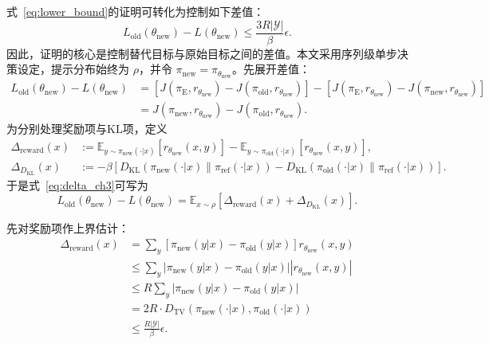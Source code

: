式~\eqref{eq:lower_bound}的证明可转化为控制如下差值：
\begin{equation}
    L_{\mathrm{old}}(\theta_{\mathrm{new}})-L(\theta_{\mathrm{new}})
    \le \frac{3R|\mathcal{Y}|}{\beta}\epsilon.
\end{equation}
因此，证明的核心是控制替代目标与原始目标之间的差值。本文采用序列级单步决策设定，提示分布始终为 $\rho$，并令 $\pi_{\mathrm{new}}=\pi_{\theta_{\mathrm{new}}}$。先展开差值：
\begin{equation}
\label{eq:delta_ch3}
\begin{aligned}
    L_{\mathrm{old}}(\theta_{\mathrm{new}})-L(\theta_{\mathrm{new}})
    &=\left[J(\pi_{\mathrm{E}},r_{\theta_{\mathrm{new}}})-J(\pi_{\mathrm{old}},r_{\theta_{\mathrm{new}}})\right]
    -\left[J(\pi_{\mathrm{E}},r_{\theta_{\mathrm{new}}})-J(\pi_{\mathrm{new}},r_{\theta_{\mathrm{new}}})\right]\\
    &=J(\pi_{\mathrm{new}},r_{\theta_{\mathrm{new}}})-J(\pi_{\mathrm{old}},r_{\theta_{\mathrm{new}}}).
\end{aligned}
\end{equation}
为分别处理奖励项与KL项，定义
\begin{equation}
\begin{aligned}
    \Delta_{\mathrm{reward}}(x)
    &:=
    \mathbb{E}_{y\sim\pi_{\mathrm{new}}(\cdot|x)}
    \left[r_{\theta_{\mathrm{new}}}(x,y)\right]
    -
    \mathbb{E}_{y\sim\pi_{\mathrm{old}}(\cdot|x)}
    \left[r_{\theta_{\mathrm{new}}}(x,y)\right],\\
    \Delta_{D_{\mathrm{KL}}}(x)
    &:=
    -\beta\left[
    D_{\mathrm{KL}}\!\left(\pi_{\mathrm{new}}(\cdot|x)\|\pi_{\mathrm{ref}}(\cdot|x)\right)
    -
    D_{\mathrm{KL}}\!\left(\pi_{\mathrm{old}}(\cdot|x)\|\pi_{\mathrm{ref}}(\cdot|x)\right)
    \right].
\end{aligned}
\end{equation}
于是式~\eqref{eq:delta_ch3}可写为
\begin{equation}
    L_{\mathrm{old}}(\theta_{\mathrm{new}})-L(\theta_{\mathrm{new}})
    =
    \mathbb{E}_{x\sim\rho}\left[\Delta_{\mathrm{reward}}(x)+\Delta_{D_{\mathrm{KL}}}(x)\right].
\end{equation}

先对奖励项作上界估计：
\begin{equation}
\begin{aligned}
    \Delta_{\mathrm{reward}}(x)
    &=\sum_y\left[\pi_{\mathrm{new}}(y|x)-\pi_{\mathrm{old}}(y|x)\right]r_{\theta_{\mathrm{new}}}(x,y)\\
    &\le \sum_y\left|\pi_{\mathrm{new}}(y|x)-\pi_{\mathrm{old}}(y|x)\right|\left|r_{\theta_{\mathrm{new}}}(x,y)\right|\\
    &\le R\sum_y\left|\pi_{\mathrm{new}}(y|x)-\pi_{\mathrm{old}}(y|x)\right|\\
    &=2R\cdot D_{\mathrm{TV}}\left(\pi_{\mathrm{new}}(\cdot|x),\pi_{\mathrm{old}}(\cdot|x)\right)\\
    &\le \frac{R|\mathcal{Y}|}{\beta}\epsilon.
\end{aligned}
\label{eq:reward_delta_bound}
\end{equation}


